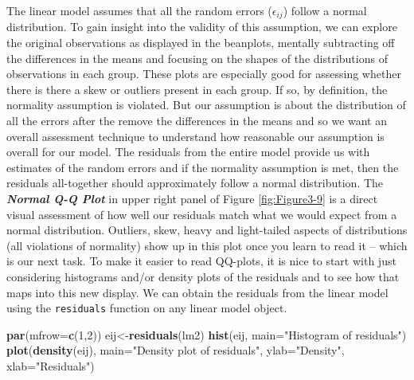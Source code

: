 \documentclass[]{book}
\newenvironment{Shaded}{\begin{snugshade}}{\end{snugshade}}
\newcommand{\KeywordTok}[1]{\textcolor[rgb]{0.13,0.29,0.53}{\textbf{#1}}}
\newcommand{\DataTypeTok}[1]{\textcolor[rgb]{0.13,0.29,0.53}{#1}}
\newcommand{\DecValTok}[1]{\textcolor[rgb]{0.00,0.00,0.81}{#1}}
\newcommand{\StringTok}[1]{\textcolor[rgb]{0.31,0.60,0.02}{#1}}
\newcommand{\NormalTok}[1]{#1}
\begin{document}
The linear model assumes that all the random errors (\(\epsilon_{ij}\))
follow a normal distribution. To gain insight into the validity of this
assumption, we can explore the original observations as displayed in the
beanplots, mentally subtracting off the differences in the means and
focusing on the shapes of the distributions of observations in each
group. These plots are especially good for assessing whether there is
there a skew or outliers present in each group. If so, by definition,
the normality assumption is violated. But our assumption is about the
distribution of all the errors after the remove the differences in the
means and so we want an overall assessment technique to understand how
reasonable our assumption is overall for our model. The residuals from
the entire model provide us with estimates of the random errors and if
the normality assumption is met, then the residuals all-together should
approximately follow a normal distribution. The \textbf{\emph{Normal Q-Q
Plot}} in upper right panel of Figure \ref{fig:Figure3-9} is a direct
visual assessment of how well our residuals match what we would expect
from a normal distribution. Outliers, skew, heavy and light-tailed
aspects of distributions (all violations of normality) show up in this
plot once you learn to read it -- which is our next task. To make it
easier to read QQ-plots, it is nice to start with just considering
histograms and/or density plots of the residuals and to see how that
maps into this new display. We can obtain the residuals from the linear
model using the \texttt{residuals} function on any linear model object.




\begin{Shaded}
\begin{Highlighting}[]
\KeywordTok{par}\NormalTok{(}\DataTypeTok{mfrow=}\KeywordTok{c}\NormalTok{(}\DecValTok{1}\NormalTok{,}\DecValTok{2}\NormalTok{))}
\NormalTok{eij<-}\KeywordTok{residuals}\NormalTok{(lm2)}
\KeywordTok{hist}\NormalTok{(eij, }\DataTypeTok{main=}\StringTok{"Histogram of residuals"}\NormalTok{)}
\KeywordTok{plot}\NormalTok{(}\KeywordTok{density}\NormalTok{(eij), }\DataTypeTok{main=}\StringTok{"Density plot of residuals"}\NormalTok{, }\DataTypeTok{ylab=}\StringTok{"Density"}\NormalTok{,}
     \DataTypeTok{xlab=}\StringTok{"Residuals"}\NormalTok{)}
\end{Highlighting}
\end{Shaded}
\end{document}
